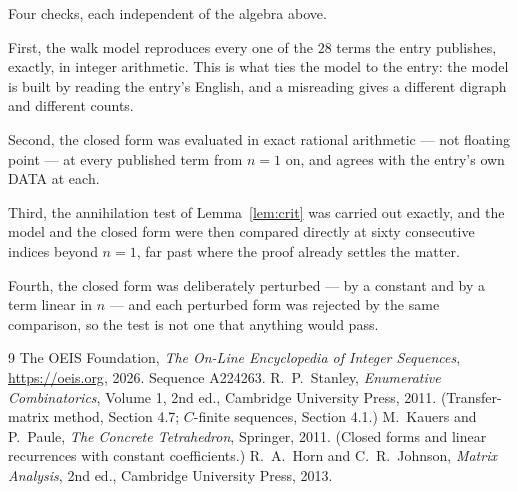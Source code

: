 \documentclass[11pt,a4paper]{article}
\theoremstyle{plain}
\theoremstyle{definition}
\begin{document}
Four checks, each independent of the algebra above.

First, the walk model reproduces every one of the $28$ terms the entry publishes,
exactly, in integer arithmetic. This is what ties the model to the entry: the model is built
by reading the entry's English, and a misreading gives a different digraph and different
counts.

Second, the closed form was evaluated in exact rational arithmetic --- not floating point ---
at every published term from $n=1$ on, and agrees with the entry's own DATA at each.

Third, the annihilation test of Lemma~\ref{lem:crit} was carried out exactly, and the model
and the closed form were then compared directly at sixty consecutive indices beyond
$n=1$, far past where the proof already settles the matter.

Fourth, the closed form was deliberately perturbed --- by a constant and by a term linear in
$n$ --- and each perturbed form was rejected by the same comparison, so the test is not one
that anything would pass.

\begin{thebibliography}{9}
 The OEIS Foundation, \emph{The On-Line Encyclopedia of Integer
Sequences}, \url{https://oeis.org}, 2026. Sequence A224263.
 R.~P.~Stanley, \emph{Enumerative Combinatorics}, Volume 1, 2nd ed.,
Cambridge University Press, 2011. (Transfer-matrix method, Section 4.7; $C$-finite sequences,
Section 4.1.)
 M.~Kauers and P.~Paule, \emph{The Concrete Tetrahedron}, Springer, 2011.
(Closed forms and linear recurrences with constant coefficients.)
 R.~A.~Horn and C.~R.~Johnson, \emph{Matrix Analysis}, 2nd ed., Cambridge
University Press, 2013.
\end{thebibliography}
\end{document}
